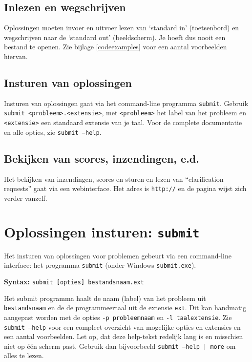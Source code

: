 \documentclass[11pt,a4paper]{article}
\newcommand{\url}[1]{\texttt{#1}}
\begin{document}
\subsection{Inlezen en wegschrijven}

Oplossingen moeten invoer en uitvoer lezen van `standard in'
(toetsenbord) en wegschrijven naar de `standard out' (beeldscherm).
Je hoeft dus nooit een bestand te openen. Zie bijlage
\ref{codeexamples} voor een aantal voorbeelden hiervan.

\subsection{Insturen van oplossingen}

Insturen van oplossingen gaat via het command-line programma
\texttt{submit}. Gebruik \texttt{submit <probleem>.<extensie>}, met
\texttt{<probleem>} het label van het probleem en \texttt{<extensie>}
een standaard extensie van je taal. Voor de complete documentatie en
alle opties, zie \texttt{submit --help}.

\subsection{Bekijken van scores, inzendingen, e.d.}

Het bekijken van inzendingen, scores en sturen en lezen van
``clarification requests'' gaat via een webinterface. Het adres is
\url{http://\WEBSERVER} en de pagina wijst zich verder vanzelf.

\newpage
\section{Oplossingen insturen: \texttt{submit}}\label{submit}

Het insturen van oplossingen voor problemen gebeurt via een
command-line interface: het programma \texttt{submit} (onder Windows
\texttt{submit.exe}).

\textbf{Syntax:} \texttt{submit [opties] bestandsnaam.ext}

Het submit programma haalt de naam (label) van het probleem uit
\texttt{bestandsnaam} en de de programmeertaal uit de extensie
\texttt{ext}. Dit kan handmatig aangepast worden met de opties
\texttt{-p probleemnaam} en \texttt{-l taalextensie}. Zie
\texttt{submit --help} voor een compleet overzicht van mogelijke
opties en extensies en een aantal voorbeelden. Let op, dat deze
help-tekst redelijk lang is en misschien niet op \'e\'en scherm
past. Gebruik dan bijvoorbeeld \texttt{submit --help | more} om alles
te lezen.
\end{document}
